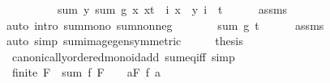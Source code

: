 \begin{isabellebody}
\ \ \isamarkupfalse%
\isanewline
\ \ \isamarkupfalse%
\ \isamarkupfalse%
\ {\isachardoublequoteopen}{\isasymdots}\ {\isasymle}\ sum\ {\isacharparenleft}{\kern0pt}{\isasymlambda}y{\isachardot}{\kern0pt}\ sum\ g\ {\isacharbraceleft}{\kern0pt}x{\isachardot}{\kern0pt}\ x{\isasymin}t\ {\isasymand}\ i\ x\ {\isacharequal}{\kern0pt}\ y{\isacharbraceright}{\kern0pt}{\isacharparenright}{\kern0pt}\ {\isacharparenleft}{\kern0pt}i\ {\isacharbackquote}{\kern0pt}\ t{\isacharparenright}{\kern0pt}{\isachardoublequoteclose}\isanewline
\ \ \ \ \isamarkupfalse%
\ assms{\isacharparenleft}{\kern0pt}{}{\isacharminus}{\kern0pt}{}{\isacharparenright}{\kern0pt}\ \isamarkupfalse%
\ {\isacharparenleft}{\kern0pt}auto\ intro{\isacharbang}{\kern0pt}{\isacharcolon}{\kern0pt}\ sum{\isacharunderscore}{\kern0pt}mono{}\ sum{\isacharunderscore}{\kern0pt}nonneg{\isacharparenright}{\kern0pt}\isanewline
\ \ \isamarkupfalse%
\ \isamarkupfalse%
\ {\isachardoublequoteopen}{\isasymdots}\ {\isasymle}\ sum\ g\ t{\isachardoublequoteclose}\isanewline
\ \ \ \ \isamarkupfalse%
\ assms\ \isamarkupfalse%
\ {\isacharparenleft}{\kern0pt}auto\ simp{\isacharcolon}{\kern0pt}\ sum{\isachardot}{\kern0pt}image{\isacharunderscore}{\kern0pt}gen{\isacharbrackleft}{\kern0pt}symmetric{\isacharbrackright}{\kern0pt}{\isacharparenright}{\kern0pt}\isanewline
\ \ \isamarkupfalse%
\ \isamarkupfalse%
\ {\isacharquery}{\kern0pt}thesis\ \isacommand{{\isachardot}{\kern0pt}}\isamarkupfalse%
\isanewline
{}\isamarkupfalse%
%
\endisatagproof
{\isafoldproof}%
%
\isadelimproof
\isanewline
%
\endisadelimproof
\isanewline
{}\isamarkupfalse%
\isanewline
\isanewline
{}\isamarkupfalse%
\ {\isacharparenleft}{\kern0pt}\ canonically{\isacharunderscore}{\kern0pt}ordered{\isacharunderscore}{\kern0pt}monoid{\isacharunderscore}{\kern0pt}add{\isacharparenright}{\kern0pt}\ sum{\isacharunderscore}{\kern0pt}eq{\isacharunderscore}{\kern0pt}{}{\isacharunderscore}{\kern0pt}iff\ {\isacharbrackleft}{\kern0pt}simp{\isacharbrackright}{\kern0pt}{\isacharcolon}{\kern0pt}\isanewline
\ \ {\isachardoublequoteopen}finite\ F\ {\isasymLongrightarrow}\ {\isacharparenleft}{\kern0pt}sum\ f\ F\ {\isacharequal}{\kern0pt}\ {}{\isacharparenright}{\kern0pt}\ {\isacharequal}{\kern0pt}\ {\isacharparenleft}{\kern0pt}{\isasymforall}a{\isasymin}F{\isachardot}{\kern0pt}\ f\ a\ {\isacharequal}{\kern0pt}\ {}{\isacharparenright}{\kern0pt}{\isachardoublequoteclose}\isanewline

\end{isabellebody}
